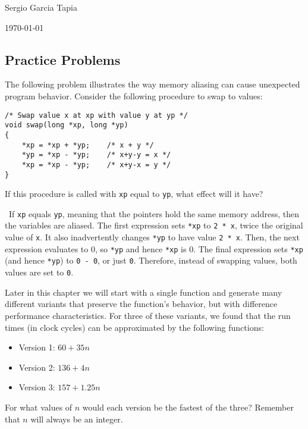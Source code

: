 \documentclass[12pt]{article}
\newenvironment{ex}[2][Exercise]{\begin{trivlist}
		\item[\hskip \labelsep {\bfseries #1}\hskip \labelsep {\bfseries #2.}]}{\end{trivlist}}
\newenvironment{sol}[1][Solution]{\begin{trivlist}
		\item[\hskip \labelsep {\bfseries #1:}]}{\end{trivlist}}
\begin{document}

\noindent Sergio Garcia Tapia \hfill

 \hfill

\noindent\today

\subsection*{Practice Problems}

\begin{ex}{5.1}
	The following problem illustrates the way memory aliasing can cause unexpected program
	behavior. Consider the following procedure to swap to values:
	\begin{lstlisting}
/* Swap value x at xp with value y at yp */
void swap(long *xp, long *yp)
{
	*xp = *xp + *yp;	/* x + y */
	*yp = *xp - *yp;	/* x+y-y = x */
	*xp = *xp - *yp;	/* x+y-x = y */
}
	\end{lstlisting}
	If this procedure is called with \texttt{xp} equal to \texttt{yp}, what effect will it
	have?
\end{ex}

\begin{sol}
	\
	If \texttt{xp} equals \texttt{yp}, meaning that the pointers hold the same memory address,
	then the variables are aliased. The first expression sets \texttt{*xp} to \texttt{2 * x},
	twice the original value of \texttt{x}. It also inadvertently changes \texttt{*yp} to
	have value \texttt{2 * x}. Then, the next expression evaluates to 0, so \texttt{*yp}
	and hence \texttt{*xp} is 0. The final expression sets \texttt{*xp} (and hence \texttt{*yp})
	to \texttt{0 - 0}, or just \texttt{0}. Therefore, instead of swapping values, both values
	are set to \texttt{0}.
\end{sol}

\begin{ex}{5.2}
	Later in this chapter we will start with a single function and generate many different
	variants that preserve the function's behavior, but with difference performance
	characteristics. For three of these variants, we found that the run times (in clock
	cycles) can be approximated by the following functions:
	\begin{itemize}
		\item Version 1: $60+35n$
		\item Version 2: $136+4n$
		\item Version 3: $157+1.25n$
	\end{itemize}
	For what values of $n$ would each version be the fastest of the three? Remember
	that $n$ will always be an integer.
\end{ex}
\end{document}
